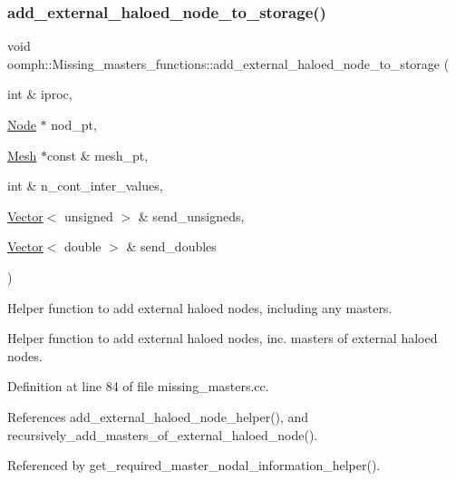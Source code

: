 \subsubsection{\texorpdfstring{add\+\_\+external\+\_\+haloed\+\_\+node\+\_\+to\+\_\+storage()}{add\_external\_haloed\_node\_to\_storage()}}
{\footnotesize\ttfamily void oomph\+::\+Missing\+\_\+masters\+\_\+functions\+::add\+\_\+external\+\_\+haloed\+\_\+node\+\_\+to\+\_\+storage (\begin{DoxyParamCaption}\item[{int \&}]{iproc,  }\item[{\hyperlink{classoomph_1_1Node}{Node} $\ast$}]{nod\+\_\+pt,  }\item[{\hyperlink{classoomph_1_1Mesh}{Mesh} $\ast$const \&}]{mesh\+\_\+pt,  }\item[{int \&}]{n\+\_\+cont\+\_\+inter\+\_\+values,  }\item[{\hyperlink{classoomph_1_1Vector}{Vector}$<$ unsigned $>$ \&}]{send\+\_\+unsigneds,  }\item[{\hyperlink{classoomph_1_1Vector}{Vector}$<$ double $>$ \&}]{send\+\_\+doubles }\end{DoxyParamCaption})}



Helper function to add external haloed nodes, including any masters. 

Helper function to add external haloed nodes, inc. masters of external haloed nodes. 

Definition at line 84 of file missing\+\_\+masters.\+cc.



References add\+\_\+external\+\_\+haloed\+\_\+node\+\_\+helper(), and recursively\+\_\+add\+\_\+masters\+\_\+of\+\_\+external\+\_\+haloed\+\_\+node().



Referenced by get\+\_\+required\+\_\+master\+\_\+nodal\+\_\+information\+\_\+helper().

\mbox{\label{namespaceoomph_1_1Missing__masters__functions_a97561cb6cf8e5ad1c876173ee5973e41}} 
